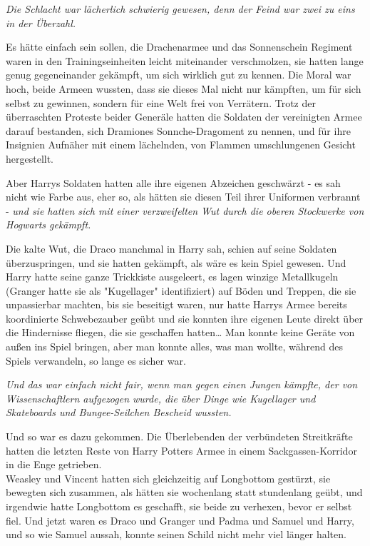 {\emph{Die Schlacht war lächerlich schwierig gewesen, denn der Feind war zwei zu eins in der Überzahl.}

Es hätte einfach sein sollen, die Drachenarmee und das Sonnenschein Regiment waren in den Trainingseinheiten leicht miteinander verschmolzen, sie hatten lange genug gegeneinander gekämpft, um sich wirklich gut zu kennen. Die Moral war hoch, beide Armeen wussten, dass sie dieses Mal nicht nur kämpften, um für sich selbst zu gewinnen, sondern für eine Welt frei von Verrätern. Trotz der überraschten Proteste beider Generäle hatten die Soldaten der vereinigten Armee darauf bestanden, sich Dramiones Sonnche-Dragoment zu nennen, und für ihre Insignien Aufnäher mit einem lächelnden, von Flammen umschlungenen Gesicht hergestellt.

Aber Harrys Soldaten hatten alle ihre eigenen Abzeichen geschwärzt - es sah nicht wie Farbe aus, eher so, als hätten sie diesen Teil ihrer Uniformen verbrannt - \emph{und sie hatten sich mit einer verzweifelten Wut durch die oberen Stockwerke von Hogwarts gekämpft.}

Die kalte Wut, die Draco manchmal in Harry sah, schien auf seine Soldaten überzuspringen, und sie hatten gekämpft, als wäre es kein Spiel gewesen. Und Harry hatte seine ganze Trickkiste ausgeleert, es lagen winzige Metallkugeln (Granger hatte sie als "Kugellager" identifiziert) auf Böden und Treppen, die sie unpassierbar machten, bis sie beseitigt waren, nur hatte Harrys Armee bereits koordinierte Schwebezauber geübt und sie konnten ihre eigenen Leute direkt über die Hindernisse fliegen, die sie geschaffen hatten… Man konnte keine Geräte von außen ins Spiel bringen, aber man konnte alles, was man wollte, während des Spiels verwandeln, so lange es sicher war.

\emph{Und das war einfach nicht fair, wenn man gegen einen Jungen kämpfte, der von Wissenschaftlern aufgezogen wurde, die über Dinge wie Kugellager und Skateboards und Bungee-Seilchen Bescheid wussten.}

Und so war es dazu gekommen. Die Überlebenden der verbündeten Streitkräfte hatten die letzten Reste von Harry Potters Armee in einem Sackgassen-Korridor in die Enge getrieben.\\ Weasley und Vincent hatten sich gleichzeitig auf Longbottom gestürzt, sie bewegten sich zusammen, als hätten sie wochenlang statt stundenlang geübt, und irgendwie hatte Longbottom es geschafft, sie beide zu verhexen, bevor er selbst fiel. Und jetzt waren es Draco und Granger und Padma und Samuel und Harry, und so wie Samuel aussah, konnte seinen Schild nicht mehr viel länger halten.

}
